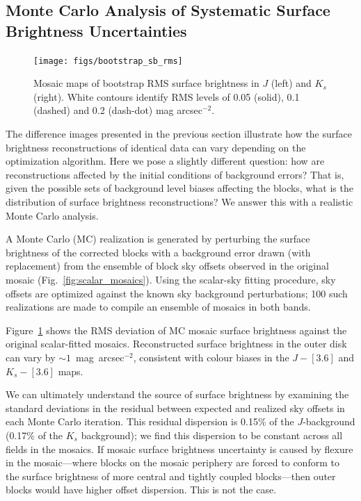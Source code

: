 \documentclass[iop]{emulateapj}
\newcommand{\Fig}[1]{Fig.~\ref{fig:#1}}  %
\begin{document}
\subsection{Monte Carlo Analysis of Systematic Surface Brightness Uncertainties}
\label{sec:montecarlo}

\begin{figure}[t]
\centering
\texttt{[image: figs/bootstrap\_sb\_rms]}
\caption{Mosaic maps of bootstrap RMS surface brightness in $J$ (left) and $K_s$ (right).
White contours identify RMS levels of 0.05 (solid), 0.1 (dashed) and 0.2 (dash-dot) mag arcsec$^{-2}$.}
\label{fig:bootstrap_sb_rms}
\end{figure}

The difference images presented in the previous section illustrate how the surface brightness reconstructions of identical data can vary depending on the optimization algorithm.
Here we pose a slightly different question: how are reconstructions affected by the initial conditions of background errors?
That is, given the possible sets of background level biases affecting the blocks, what is the distribution of surface brightness reconstructions?
We answer this with a realistic Monte Carlo analysis.

A Monte Carlo (MC) realization is generated by perturbing the surface brightness of the corrected blocks with a background error drawn (with replacement) from the ensemble of block sky offsets observed in the original mosaic (\Fig{scalar_mosaics}).
Using the scalar-sky fitting procedure, sky offsets  are optimized against the known sky background perturbations; 100 such realizations are made to compile an ensemble of mosaics in both bands.

Figure~\ref{fig:bootstrap_sb_rms} shows the RMS deviation of MC mosaic surface brightness against the original scalar-fitted mosaics.
Reconstructed surface brightness in the outer disk can vary by $\sim 1$~mag~arcsec$^{-2}$, consistent with colour biases in the $J-[3.6]$ and $K_s-[3.6]$ maps.

We can ultimately understand the source of surface brightness by examining the standard deviations in the residual between expected and realized sky offsets in each Monte Carlo iteration.
This residual dispersion is 0.15\% of the $J$-background (0.17\% of the $K_s$ background); we find this dispersion to be constant across all fields in the mosaics.
If mosaic surface brightness uncertainty is caused by flexure in the mosaic---where blocks on the mosaic periphery are forced to conform to the surface brightness of more central and tightly coupled blocks---then outer blocks would have higher offset dispersion.
This is not the case.
\end{document}
